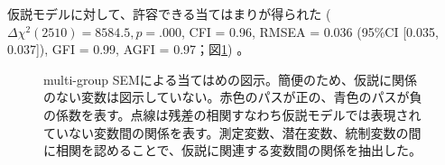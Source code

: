 \documentclass[a4j,12pt]{jreport}
\begin{document}
仮説モデルに対して、許容できる当てはまりが得られた ( $\Delta \chi ^2(2510) = 8584.5, p = .000$, CFI = 0.96, RMSEA = 0.036 (95\%CI [0.035, 0.037]), GFI = 0.99, AGFI = 0.97；図\ref{fig:SEM}) 。




\begin{figure}[H]
  \centering
{}%
          \label{subfig:sem}
%
          \label{subfig:red}
  \caption[multi-group SEMによる当てはめの図示]{multi-group SEMによる当てはめの図示。簡便のため、仮説に関係のない変数は図示していない。赤色のパスが正の、青色のパスが負の係数を表す。点線は残差の相関すなわち仮説モデルでは表現されていない変数間の関係を表す。測定変数、潜在変数、統制変数の間に相関を認めることで、仮説に関連する変数間の関係を抽出した。}
  \label{fig:SEM}
\end{figure}











%
\end{document}
